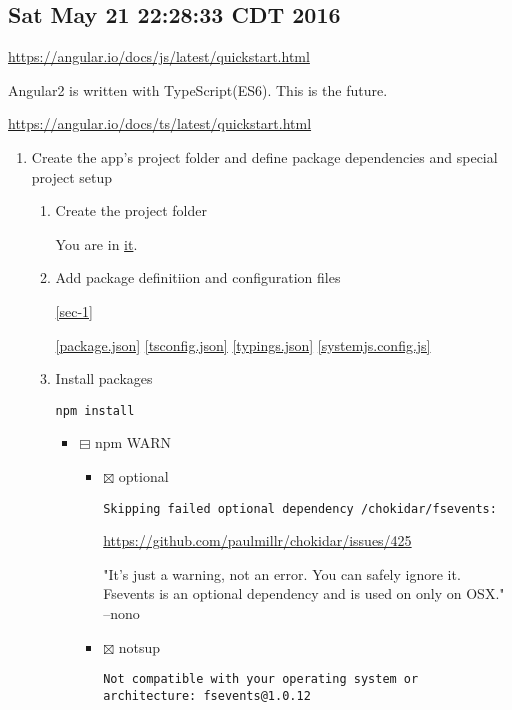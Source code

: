 \documentclass[11pt]{article}
\begin{document}
\subsection{Sat May 21 22:28:33 CDT 2016}
\label{sec-5-3}

\url{https://angular.io/docs/js/latest/quickstart.html}

Angular2 is written with TypeScript(ES6). This is the future.

\url{https://angular.io/docs/ts/latest/quickstart.html}

\begin{enumerate}
\item Create the app's project folder and define package dependencies and special
project setup

\begin{enumerate}
\item Create the project folder

You are in \href{./}{it}.

\item Add package definitiion and configuration files

\ref{sec-1}

\ref{package.json}
\ref{tsconfig.json}
\ref{typings.json}
\ref{systemjs.config.js}

\item Install packages

\begin{verbatim}
npm install
\end{verbatim}

\begin{itemize}
\item $\boxminus$ npm WARN
\begin{itemize}
\item $\boxtimes$ optional

\begin{verbatim}
Skipping failed optional dependency /chokidar/fsevents:
\end{verbatim}

\url{https://github.com/paulmillr/chokidar/issues/425}

"It's just a warning, not an error. You can safely ignore it. 
Fsevents is an optional dependency and is used on only on OSX."
--nono

\item $\boxtimes$ notsup

\begin{verbatim}
Not compatible with your operating system or architecture: fsevents@1.0.12
\end{verbatim}


\end{itemize}
\end{itemize}
\end{enumerate}
\end{enumerate}
\end{document}
